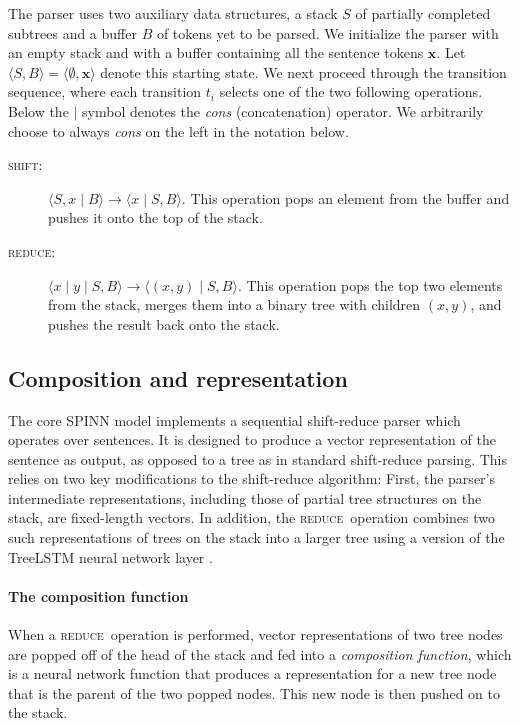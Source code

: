 \documentclass[11pt]{article}
\newcommand{\shift}{\textsc{shift}}
\newcommand{\reduce}{\textsc{reduce}}
\begin{document}
The parser uses two auxiliary data structures, a stack $S$ of partially completed subtrees and a buffer $B$ of tokens yet to be parsed. We initialize the parser with an empty stack and with a buffer containing all the sentence tokens $\mathbf x$. Let $\langle S, B \rangle = \langle \emptyset, \mathbf x \rangle$ denote this starting state. We next proceed through the transition sequence, where each transition $t_i$ selects one of the two following operations. Below the $\mid$ symbol denotes the \textit{cons} (concatenation) operator. We arbitrarily choose to always \textit{cons} on the left in the notation below.
\begin{description}
  \item[\shift:] $\langle S, x \mid B \rangle \to \langle x \mid S, B \rangle$. This operation pops an element from the buffer and pushes it onto the top of the stack.
  \item[\reduce:] $\langle x \mid y \mid S, B \rangle \to \langle (x, y) \mid S, B \rangle$. This operation pops the top two elements from the stack, merges them into a binary tree with children $(x, y)$, and pushes the result back onto the stack.
\end{description}

\subsection{Composition and representation}

The core SPINN model implements a sequential shift-reduce parser which operates over sentences. It is designed to produce a vector representation of the sentence as output, as opposed to a tree as in standard shift-reduce parsing. This relies on two key modifications to the shift-reduce algorithm: First, the parser's intermediate representations, including those of partial tree structures on the stack, are fixed-length vectors. In addition, the \reduce~operation combines two such representations of trees on the stack into a larger tree using a version of the TreeLSTM neural network layer \citep{tai2015improved}.

\paragraph{The composition function}
When a \reduce~operation is performed, vector representations of two tree nodes are popped off of the head of the stack and fed into a {\it composition function}, which is a neural network function that produces a representation for a new tree node that is the parent of the two popped nodes. This new node is then pushed on to the stack.
\end{document}
